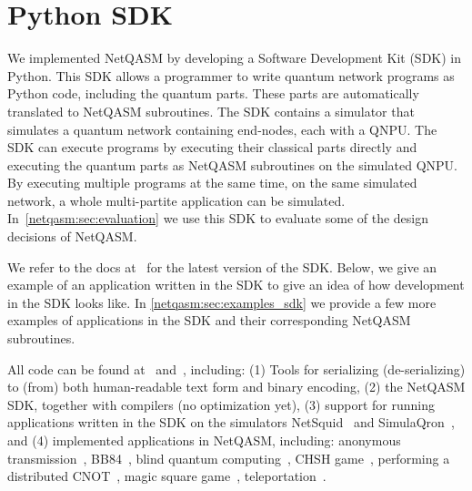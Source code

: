 \section{Python SDK}
\label{netqasm:sec:python-sdk}
We implemented \ac{NetQASM} by developing a Software Development Kit (SDK) in Python.
This SDK allows a programmer to write quantum network programs as Python code, including the quantum parts.
These parts are automatically translated to NetQASM subroutines.
The SDK contains a simulator that simulates a quantum network containing end-nodes, each with a \ac{QNPU}.
The SDK can execute programs by executing their classical parts directly and executing the quantum parts as \ac{NetQASM} subroutines on the simulated \ac{QNPU}.
By executing multiple programs at the same time, on the same simulated network, a whole multi-partite application can be simulated.
In~\cref{netqasm:sec:evaluation} we use this SDK to evaluate some of the design decisions of \ac{NetQASM}.

We refer to the docs at~\cite{git_netqasm} for the latest version of the SDK.
Below, we give an example of an application written in the SDK to give an idea of how development in the SDK looks like.
In \cref{netqasm:sec:examples_sdk} we provide a few more examples of applications in the SDK and their corresponding \ac{NetQASM} subroutines.

All code can be found at~\cite{git_netqasm} and~\cite{git_squidasm}, including:
    (1) Tools for serializing (de-serializing) to (from) both human-readable text form and binary encoding,
    (2) the \ac{NetQASM} SDK, together with compilers (no optimization yet),
    (3) support for running applications written in the SDK on the simulators NetSquid~\cite{netsquid,coopmans2021netsquid} and SimulaQron~\cite{dahlberg2018simulaqron}, and
    (4) implemented applications in \ac{NetQASM}, including: anonymous transmission~\cite{Christandl2005anonymous}, BB84~\cite{bb84}, blind quantum computing~\cite{broadbent2009universal,fitzsimons2017unconditionally}, CHSH game~\cite{Kaniewski2016}, performing a distributed CNOT~\cite{denchev2008distributed}, magic square game~\cite{brassard1999magicsquare}, teleportation~\cite{bennett1993teleporting}.

